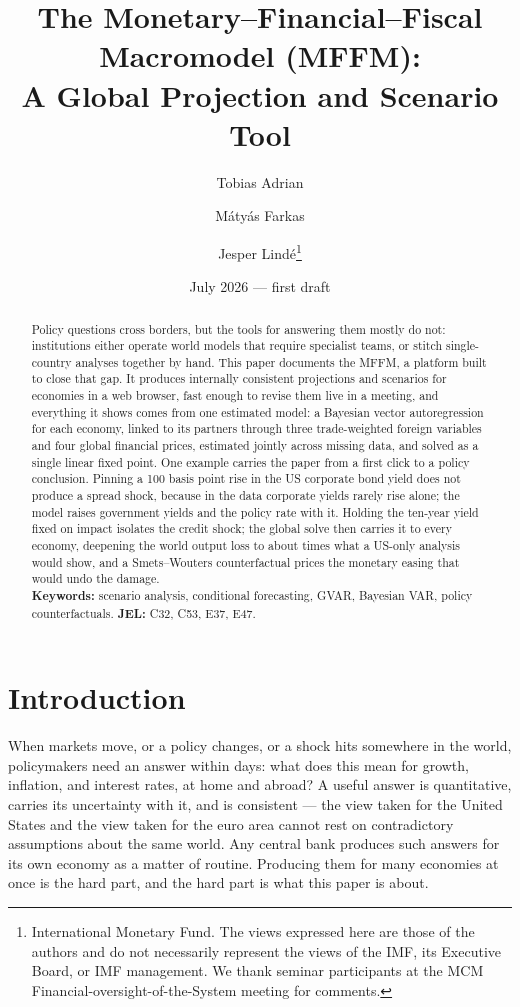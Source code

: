 \documentclass[11pt]{article}
\title{\textbf{The Monetary--Financial--Fiscal Macromodel (MFFM):\\
A Global Projection and Scenario Tool}}
\author{Tobias Adrian \and M\'aty\'as Farkas \and Jesper Lind\'e\thanks{%
International Monetary Fund. The views expressed here are those of the authors and do not
necessarily represent the views of the IMF, its Executive Board, or IMF management. We thank
seminar participants at the MCM Financial-oversight-of-the-System meeting for comments.}}
\date{July 2026 --- first draft}
\begin{document}
\maketitle

\begin{abstract}
\noindent Policy questions cross borders, but the tools for answering them mostly do not:
institutions either operate world models that require specialist teams, or stitch
single-country analyses together by hand. This paper documents the MFFM, a platform built to
close that gap. It produces internally consistent projections and scenarios for \NModels{}
economies in a web browser, fast enough to revise them live in a meeting, and everything it
shows comes from one estimated model: a Bayesian vector autoregression for each economy,
linked to its partners through three trade-weighted foreign variables and four global
financial prices, estimated jointly across missing data, and solved as a single linear fixed
point. One example carries the paper from a first click to a policy conclusion. Pinning a 100
basis point rise in the US corporate bond yield does not produce a spread shock, because in
the data corporate yields rarely rise alone; the model raises government yields and the
policy rate with it. Holding the ten-year yield fixed on impact isolates the credit shock;
the global solve then carries it to every economy, deepening the world output loss to about
\WorldTroughRatio{} times what a US-only analysis would show, and a Smets--Wouters counterfactual prices the monetary easing
that would undo the damage. \\[6pt]
\textbf{Keywords:} scenario analysis, conditional forecasting, GVAR, Bayesian VAR, policy
counterfactuals. \quad \textbf{JEL:} C32, C53, E37, E47.
\end{abstract}

\section{Introduction}\label{sec:intro}

When markets move, or a policy changes, or a shock hits somewhere in the world, policymakers
need an answer within days: what does this mean for growth, inflation, and interest rates, at
home and abroad? A useful answer is quantitative, carries its uncertainty with it, and is
consistent --- the view taken for the United States and the view taken for the euro area
cannot rest on contradictory assumptions about the same world. Any central bank produces such
answers for its own economy as a matter of routine. Producing them for many economies at once
is the hard part, and the hard part is what this paper is about.
\end{document}
